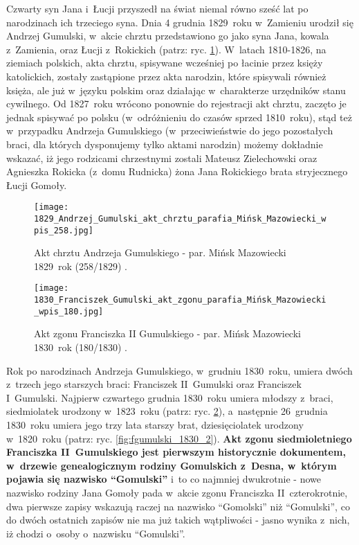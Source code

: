 Czwarty syn Jana i~Łucji przyszedł na świat niemal równo sześć lat po 
narodzinach ich trzeciego syna. Dnia 4 grudnia 1829~roku w~Zamieniu urodził 
się Andrzej Gumulski, w~akcie chrztu przedstawiono go jako syna Jana, kowala 
z~Zamienia, oraz Łucji z~Rokickich (patrz: ryc. \ref{fig:agumulski_1829}). 
W~latach 1810-1826, na ziemiach polskich, akta chrztu, spisywane wcześniej po 
łacinie przez księży katolickich, zostały zastąpione przez akta narodzin, 
które spisywali również księża, ale już w~języku polskim oraz działając 
w~charakterze urzędników stanu cywilnego. Od 1827~roku wrócono ponownie do 
rejestracji akt chrztu, zaczęto je jednak spisywać po polsku (w~odróżnieniu 
do czasów sprzed 1810~roku), stąd też w~przypadku Andrzeja Gumulskiego 
(w~przeciwieństwie do jego pozostałych braci, dla których dysponujemy tylko 
aktami narodzin) możemy dokładnie wskazać, iż jego rodzicami chrzestnymi 
zostali Mateusz Zielechowski oraz Agnieszka Rokicka (z~domu Rudnicka) żona 
Jana Rokickiego brata stryjecznego Łucji Gomoły.

\begin{figure}[!ht]
    \vspace*{0.5cm}
    \centering \texttt{[image: 
        1829\_Andrzej\_Gumulski\_akt\_chrztu\_parafia\_Mińsk\_Mazowiecki\_wpis\_258.jpg]}
    \captionsetup{format=hang}
    \caption{Akt chrztu Andrzeja Gumulskiego - par. Mińsk Mazowiecki 
    1829~rok (258/1829) \cite{par_minsk2}.}
    \label{fig:agumulski_1829}
\end{figure}

\begin{figure}[!ht]
    \vspace*{0.5cm}
    \centering \texttt{[image: 
        1830\_Franciszek\_Gumulski\_akt\_zgonu\_parafia\_Mińsk\_Mazowiecki\_wpis\_180.jpg]}
    \captionsetup{format=hang}
    \caption{Akt zgonu Franciszka II Gumulskiego - par. Mińsk Mazowiecki 
    1830~rok (180/1830) \cite{par_minsk2}.}
    \label{fig:fgumulski_1830_1}
\end{figure}

Rok po narodzinach Andrzeja Gumulskiego, w~grudniu 1830~roku, umiera dwóch 
z~trzech jego starszych braci: Franciszek II~Gumulski oraz 
Franciszek I~Gumulski. Najpierw czwartego grudnia 1830~roku umiera młodszy 
z~braci, siedmiolatek urodzony w~1823~roku (patrz: 
ryc. \ref{fig:fgumulski_1830_1}), a~następnie 26~grudnia 1830~roku umiera 
jego trzy lata starszy brat, dziesięciolatek urodzony w~1820~roku (patrz: ryc. 
\ref{fig:fgumulski_1830_2}). \textbf{Akt zgonu siedmioletniego Franciszka 
II~Gumulskiego jest pierwszym historycznie dokumentem, w~drzewie 
genealogicznym rodziny Gomulskich z~Desna, w~którym pojawia się nazwisko 
\enquote{Gomulski}} i~to co najmniej dwukrotnie - nowe nazwisko rodziny 
Jana Gomoły pada w~akcie zgonu Franciszka II~czterokrotnie, dwa pierwsze 
zapisy wskazują raczej na nazwisko \enquote{Gomolski} niż \enquote{Gomulski}, 
co do dwóch ostatnich zapisów nie ma już takich wątpliwości - jasno wynika 
z~nich, iż chodzi o~osoby o~nazwisku \enquote{Gomulski}.

